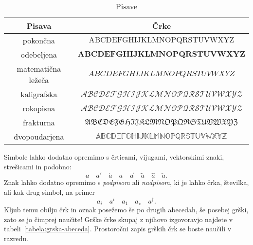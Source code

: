 \begin{table}[ht]
\centering
\begin{tabular}{c|c}
\textbf{Pisava} & \textbf{Črke} \\
\hline
pokončna & $\mathrm{ABCDEFGHIJKLMNOPQRSTUVWXYZ}$ \\
odebeljena & $\mathbf{ABCDEFGHIJKLMNOPQRSTUVWXYZ}$ \\
matematična ležeča & $ABCDEFGHIJKLMNOPQRSTUVWXYZ$ \\
kaligrafska & $\mathcal{ABCDEFGHIJKLMNOPQRSTUVWXYZ}$ \\
rokopisna & $\mathscr{ABCDEFGHIJKLMNOPQRSTUVWXYZ}$ \\
frakturna & $\mathfrak{ABCDEFGHIJKLMNOPQRSTUVWXYZ}$ \\
dvopoudarjena & $\mathbb{ABCDEFGHIJKLMNOPQRSTUVWXYZ}$
\end{tabular}
\caption{Pisave}\label{tabela:oblike-crk}
\end{table}

Simbole lahko dodatno opremimo s črticami, vijugami, vektorskimi znaki, strešicami in podobno:
%
\begin{equation*}
 a \quad
 a' \quad
 \dot{a} \quad
 \bar{a} \quad
 \vec{a} \quad
 \tilde{a} \quad
 \hat{a} \quad
 \check{a}.
\end{equation*}
%
 Znak lahko dodatno opremimo s
\emph{podpisom} ali \emph{nadpisom}, ki je lahko črka, številka, ali kak drug simbol, na
primer
%
\begin{equation*}
  a_i \quad
  a^i \quad
  a_1 \quad
  a_{\star} \quad
  a^{\dagger}.
\end{equation*}
%
Kljub temu obilju črk in oznak posežemo še po drugih abecedah, še posebej grški, zato
se jo čimprej naučite! Grške črke skupaj z njihovo izgovoravjo najdete v
tabeli~\ref{tabela:grska-abeceda}. Prostoročni zapis grških črk se boste naučili v
razredu.

